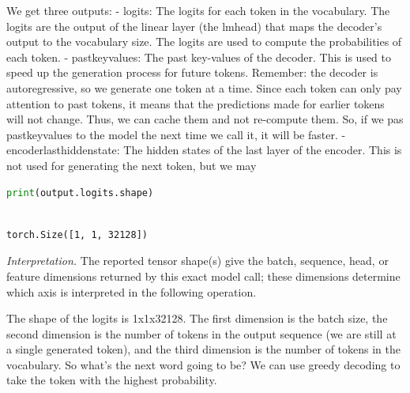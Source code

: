 \documentclass[../labs.tex]{subfiles}
\begin{document}


\noindent We get three outputs: - logits: The logits for each token in the vocabulary. The logits are the output of the linear layer (the lmhead) that maps the decoder's output to the vocabulary size. The logits are used to compute the probabilities of each token. - pastkeyvalues: The past key-values of the decoder. This is used to speed up the generation process for future tokens. Remember: the decoder is autoregressive, so we generate one token at a time. Since each token can only pay attention to past tokens, it means that the predictions made for earlier tokens will not change. Thus, we can cache them and not re-compute them. So, if we pas pastkeyvalues to the model the next time we call it, it will be faster. - encoderlasthiddenstate: The hidden states of the last layer of the encoder. This is not used for generating the next token, but we may

\begin{lstlisting}[language=Python,basicstyle=\ttfamily\scriptsize,breaklines=true,breakatwhitespace=false,columns=fullflexible,keepspaces=true,numbers=none]
print(output.logits.shape)
\end{lstlisting}

\hypertarget{res:lab02-text-01-t5-ipynb-74-2013d6cfe757}{}

\begin{lstlisting}[basicstyle=\ttfamily\scriptsize,breaklines=true,breakatwhitespace=false,columns=fullflexible,keepspaces=true]

torch.Size([1, 1, 32128])

\end{lstlisting}

\noindent\emph{Interpretation.} The reported tensor shape(s) give the batch, sequence, head, or feature dimensions returned by this exact model call; these dimensions determine which axis is interpreted in the following operation.



\noindent The shape of the logits is 1x1x32128. The first dimension is the batch size, the second dimension is the number of tokens in the output sequence (we are still at a single generated token), and the third dimension is the number of tokens in the vocabulary. So what's the next word going to be? We can use greedy decoding to take the token with the highest probability.
\end{document}
